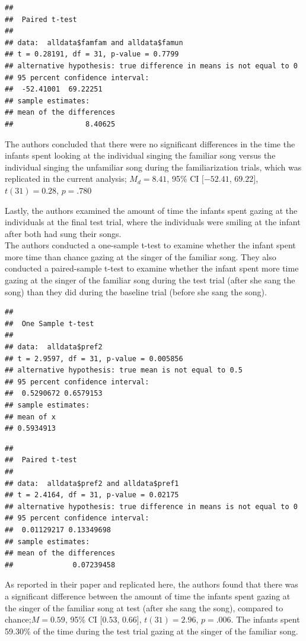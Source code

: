 \documentclass[
  english,
  man]{apa6}
\begin{document}
\begin{verbatim}
## 
##  Paired t-test
## 
## data:  alldata$famfam and alldata$famun
## t = 0.28191, df = 31, p-value = 0.7799
## alternative hypothesis: true difference in means is not equal to 0
## 95 percent confidence interval:
##  -52.41001  69.22251
## sample estimates:
## mean of the differences 
##                 8.40625
\end{verbatim}

The authors concluded that there were no significant differences in the time the infants spent looking at the individual singing the familiar song versus the individual singing the unfamiliar song during the familiarization trials, which was replicated in the current analysis; \(M_d = 8.41\), 95\% CI \([-52.41\), \(69.22]\), \(t(31) = 0.28\), \(p = .780\)

Lastly, the authors examined the amount of time the infants spent gazing at the individuals at the final test trial, where the individuals were smiling at the infant after both had sung their songs.\\
The authors conducted a one-sample t-test to examine whether the infant spent more time than chance gazing at the singer of the familiar song. They also conducted a paired-sample t-test to examine whether the infant spent more time gazing at the singer of the familiar song during the test trial (after she sang the song) than they did during the baseline trial (before she sang the song).

\begin{verbatim}
## 
##  One Sample t-test
## 
## data:  alldata$pref2
## t = 2.9597, df = 31, p-value = 0.005856
## alternative hypothesis: true mean is not equal to 0.5
## 95 percent confidence interval:
##  0.5290672 0.6579153
## sample estimates:
## mean of x 
## 0.5934913
\end{verbatim}

\begin{verbatim}
## 
##  Paired t-test
## 
## data:  alldata$pref2 and alldata$pref1
## t = 2.4164, df = 31, p-value = 0.02175
## alternative hypothesis: true difference in means is not equal to 0
## 95 percent confidence interval:
##  0.01129217 0.13349698
## sample estimates:
## mean of the differences 
##              0.07239458
\end{verbatim}

As reported in their paper and replicated here, the authors found that there was a significant difference between the amount of time the infants spent gazing at the singer of the familiar song at test (after she sang the song), compared to chance;\(M = 0.59\), 95\% CI \([0.53\), \(0.66]\), \(t(31) = 2.96\), \(p = .006\). The infants spent 59.30\% of the time during the test trial gazing at the singer of the familiar song.
\end{document}
